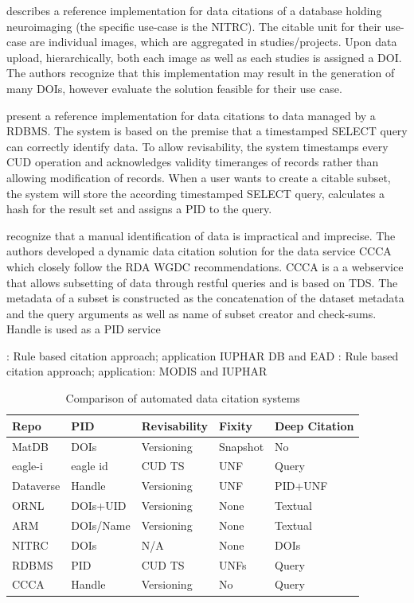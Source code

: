 \documentclass[letterpaper, twocolumn, parskip=half, fontsize=8pt, DIV=calc]{scrartcl}
\begin{document}
\cite{Honor2016} describes a reference implementation for data citations of a database holding neuroimaging (the specific use-case is the \gls{NITRC}). The citable unit for their use-case are individual images, which are aggregated in studies/projects. Upon data upload, hierarchically, both each image as well as each studies is assigned a \gls{DOI}. The authors recognize that this implementation may result in the generation of many \glspl{DOI}, however evaluate the solution feasible for their use case.

\cite{Proll2013} present a reference implementation for data citations to data managed by a \gls{RDBMS}. 
The system is based on the premise that a timestamped SELECT query can correctly identify data. To allow revisability, the system timestamps every \gls{CUD} operation and acknowledges validity timeranges of records rather than allowing modification of records. When a user wants to create a citable subset, the system will store the according timestamped SELECT query, calculates a hash for the result set and assigns a PID to the query. 

\cite{Schubert2019} recognize that a manual identification of data is impractical and imprecise. The authors developed a dynamic data citation solution for the data service \gls{CCCA} which closely follow the \gls{RDA} \gls{WGDC} \citep{Rauber2015, Rauber2015} recommendations. CCCA is a a webservice that allows subsetting of data through restful queries and is based on \gls{TDS}.
The metadata of a subset is constructed as the concatenation of the dataset metadata and the query arguments as well as name of subset creator and check-sums. 
Handle is used as a PID service


\citep{Buneman2010}: Rule based citation approach; application IUPHAR DB and EAD
\citep{Buneman2016}: Rule based citation approach; application: MODIS and IUPHAR 

\begin{table}
\caption{Comparison of automated data citation systems}
\begin{tabular}{l l l l l}
\toprule
    Repo        & PID           & Revisability   & Fixity   & Deep Citation \\\midrule
    MatDB       & DOIs          & Versioning     & Snapshot & No  \\
    eagle-i     & eagle id      & CUD TS         & UNF      & Query\\
    Dataverse   & Handle        & Versioning     & UNF      & PID+UNF \\ 
    ORNL        & DOIs+UID      & Versioning     & None     & Textual \\
    ARM         & DOIs/Name     & Versioning     & None     & Textual \\
    NITRC       & DOIs          & N/A            & None     & DOIs  \\
    RDBMS       & PID           & CUD TS         & UNFs     & Query \\
    CCCA        & Handle        & Versioning    & No       & Query \\
\bottomrule     
\end{tabular}
\label{tab_citcomp}
\end{table}
\end{document}
